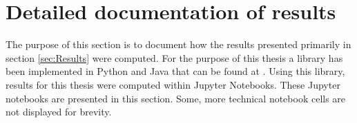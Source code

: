 \documentclass[../Thesis_AHoecherl.tex]{subfiles}
\begin{document}
    \chapter{Detailed documentation of results}\label{Detailed documentation of results}
    The purpose of this section is to document how the results presented primarily in section \ref{sec:Results} were computed.
    For the purpose of this thesis a library has been implemented in Python and Java that can be found at \cite{Hoecherl2020}.
    Using this library, results for this thesis were computed within Jupyter Notebooks. These Jupyter notebooks are presented in this section. 
    Some, more technical notebook cells are not displayed for brevity.

    

    

    

    

    

    
    
    

    

    

    
\end{document}
